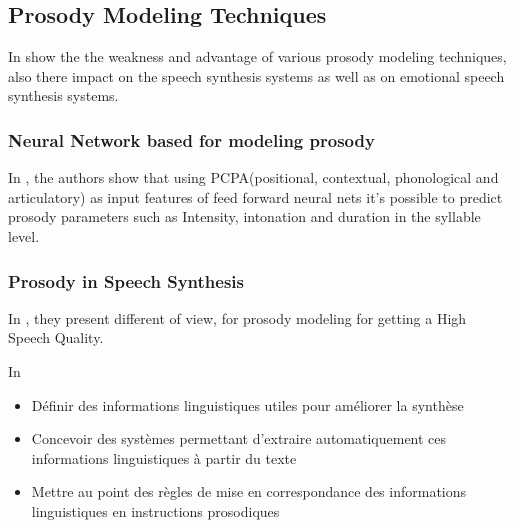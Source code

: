 \subsection{Prosody Modeling Techniques}
In \citep{key:article} show the the weakness and advantage of various prosody modeling techniques, also there impact on the speech synthesis systems as well as on emotional speech synthesis systems.
\subsubsection{Neural Network based  for modeling prosody}
In \citep{RamuReddy:2016:PMS:2839529.2839900}, the authors show that using PCPA(positional, contextual, phonological and articulatory) as input features of feed forward neural nets it's possible to predict  prosody parameters such as Intensity, intonation and duration in the syllable level.


\subsubsection{Prosody in Speech Synthesis}

In \citep{hirose2015speech}, they present different of view, for prosody modeling for getting a High Speech Quality.

In \citep{Rao:2012:PPT:2222511}



\begin{itemize}
\item Définir des informations linguistiques utiles pour améliorer la synthèse
\item Concevoir des systèmes permettant d’extraire automatiquement ces informations linguistiques à partir du texte
\item Mettre au point des règles de mise en correspondance des informations linguistiques en instructions prosodiques
\end{itemize}